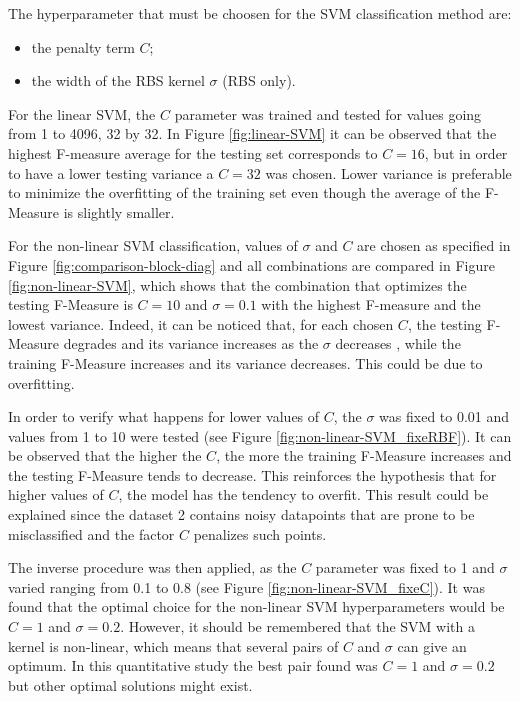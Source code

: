 \documentclass[a4paper,10pt]{article}
\begin{document}
The hyperparameter that must be choosen for the SVM classification method are:
\begin{itemize}
  \item the penalty term $C$;
  \item the width of the RBS kernel $\sigma$ (RBS only).
\end{itemize}

 For the linear SVM, the $C$ parameter was trained and tested for values going from 1 to 4096, 32 by 32. In Figure \ref{fig:linear-SVM} it can be observed that the highest F-measure average for the testing set corresponds to $C=16$, but in order to have a lower testing variance a $C = 32$ was chosen. Lower variance is preferable to minimize the overfitting of the training set even though the average of the F-Measure is slightly smaller.

 For the non-linear SVM classification, values of $\sigma$ and $C$ are chosen as specified in Figure \ref{fig:comparison-block-diag} and all combinations are compared in Figure \ref{fig:non-linear-SVM}, which shows that the combination that optimizes the testing F-Measure is $ C = 10 $ and $ \sigma = 0.1$ with the highest F-measure and the lowest variance. Indeed, it can be noticed that, for each chosen $C$, the testing F-Measure degrades and its variance increases as the $\sigma$ decreases , while the training F-Measure increases and its variance decreases. This could be due to overfitting. 

In order to verify what happens for lower values of $C$, the $\sigma$ was fixed to 0.01 and values from 1 to 10 were tested (see Figure \ref{fig:non-linear-SVM_fixeRBF}). It can be observed that the higher the $C$, the more the training F-Measure increases and the testing F-Measure tends to decrease. This reinforces the hypothesis that for higher values of $C$, the model has the tendency to overfit. This result could be explained since the dataset 2 contains noisy datapoints that are prone to be misclassified and the factor $C$ penalizes such points. 

The inverse procedure was then applied, as the $C$ parameter was fixed to 1 and $\sigma$ varied ranging from 0.1 to 0.8 (see Figure \ref{fig:non-linear-SVM_fixeC}). It was found that the optimal choice for the non-linear SVM hyperparameters would be $C = 1$ and $\sigma = 0.2$. However, it should be remembered that the SVM with a kernel is non-linear, which means that several pairs of $C$ and $\sigma$ can give an optimum. In this quantitative study the best pair found was $C = 1$ and $\sigma = 0.2$ but other optimal solutions might exist.
\end{document}
